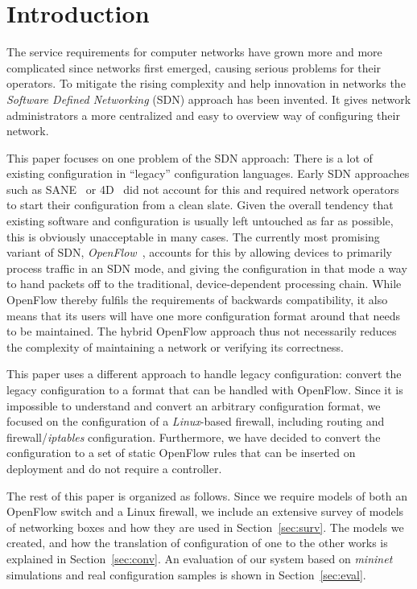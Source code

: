 \section{Introduction}
The service requirements for computer networks have grown more and more complicated since networks first emerged, causing serious problems for their operators.
To mitigate the rising complexity and help innovation in networks the \emph{Software Defined Networking} (SDN) approach has been invented.
It gives network administrators a more centralized and easy to overview way of configuring their network. 

This paper focuses on one problem of the SDN approach: There is a lot of existing configuration in ``legacy'' configuration languages.
Early SDN approaches such as SANE~\cite{casado2006sane} or 4D~\cite{greenberg2005clean} did not account for this and required network operators to start their configuration from a clean slate.
Given the overall tendency that existing software and configuration is usually left untouched as far as possible, this is obviously unacceptable in many cases.
The currently most promising variant of SDN, \emph{OpenFlow}~\cite{mckeown2008openflow}, accounts for this by allowing devices to primarily process traffic in an SDN mode, and giving the configuration in that mode a way to hand packets off to the traditional, device-dependent processing chain.
While OpenFlow thereby fulfils the requirements of backwards compatibility, it also means that its users will have one more configuration format around that needs to be maintained.
The hybrid OpenFlow approach thus not necessarily reduces the complexity of maintaining a network or verifying its correctness.

This paper uses a different approach to handle legacy configuration: convert the legacy configuration to a format that can be handled with OpenFlow.
Since it is impossible to understand and convert an arbitrary configuration format, we focused on the configuration of a \emph{Linux}-based firewall, including routing and firewall/\emph{iptables} configuration.
Furthermore, we have decided to convert the configuration to a set of static OpenFlow rules that can be inserted on deployment and do not require a controller.

The rest of this paper is organized as follows.
Since we require models of both an OpenFlow switch and a Linux firewall, we include an extensive survey of models of networking boxes and how they are used in Section~\ref{sec:surv}.
The models we created, and how the translation of configuration of one to the other works is explained in Section~\ref{sec:conv}.
An evaluation of our system based on \emph{mininet}~\cite{lantz2010network} simulations and real configuration samples is shown in Section~\ref{sec:eval}.

